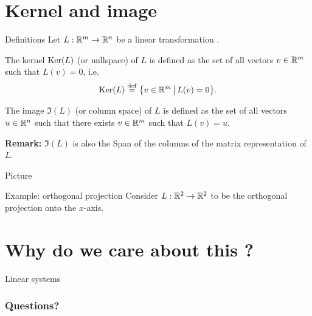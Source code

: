 \documentclass{beamer}
\begin{document}
\section{Kernel and image}

\begin{frame}[t]{Definitions}
	Let \quad $L: \mathbb{R}^m \to \mathbb{R}^n$ \quad be a linear transformation .
	\begin{definition}[Kernel]
		The kernel ${{\rm Ker}}(L)$ (or nullspace) of $L$ is defined as the set of all vectors $v \in \mathbb{R}^m$ such that $L(v) = 0$, i.e.
		$$
		{{\rm Ker}}(L) \overset{\rm def}{=} \big\{ v \in \mathbb{R}^m \, \big| \, L(v) = 0 \big\}.
		$$
	\end{definition}

	\begin{definition}[Image]
		The image $\Im(L)$ (or column space) of $L$ is defined as the set of all vectors $u \in \mathbb{R}^n$ such that there exists $v \in \mathbb{R}^m$ such that $L(v) = u$. 
	\end{definition}
	\textbf{Remark:} $\Im(L)$ is also the Span of the columns of the matrix representation of $L$.
\end{frame}



\begin{frame}{Picture}
\end{frame}


\begin{frame}[t]{Example: orthogonal projection}
	Consider \quad $L: \mathbb{R}^2 \to \mathbb{R}^2$ \quad to be the orthogonal projection onto the $x$-axis.
\end{frame}


\section{Why do we care about this ?}

\begin{frame}[t]{Linear systems}


\end{frame}

\appendix
\backupbegin
\begin{frame}
	\frametitle{Questions?}
\end{frame}
\backupend
\end{document}
